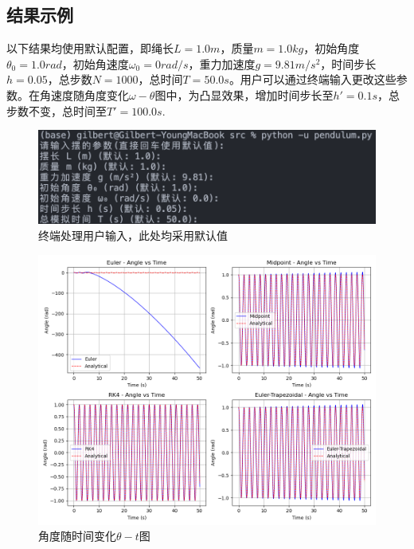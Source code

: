 \subsection{结果示例}
以下结果均使用默认配置，即绳长$L = 1.0m$，质量$m = 1.0kg$，初始角度$\theta_0 = 1.0 rad$，初始角速度$\omega_0 = 0 rad/s$，重力加速度$g = 9.81 m/s^2$，时间步长$h = 0.05$，总步数$N = 1000$，总时间$T = 50.0s$。用户可以通过终端输入更改这些参数。在角速度随角度变化$\omega - \theta $图中，为凸显效果，增加时间步长至$h'=0.1s$，总步数不变，总时间至$T'=100.0s$.
\begin{figure}[H]
    \centering
    \includegraphics[width=1.0\textwidth]{Problem_1/figs/terminal.png}
    \caption{终端处理用户输入，此处均采用默认值}
\end{figure}
\begin{figure}[H]
    \centering
    \includegraphics[width=1.0\textwidth]{Problem_1/figs/angle_time.png}
    \caption{角度随时间变化$\theta - t $图}
\end{figure}
